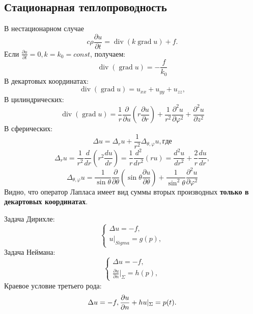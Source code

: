 \documentclass[11pt]{article}
\newcounter{th}\setcounter{th}{0}
\begin{document}
\subsection{Стационарная теплопроводность}
\label{sec:org97c7822}
В нестационарном случае
\begin{equation}
c\rho\frac{\partial u}{\partial t} = \operatorname{div}(k\operatorname{grad} u) + f.
\end{equation}
Если $\frac{\partial u}{\partial t} = 0, k = k_0 = const$, получаем:
\begin{equation}
\operatorname{div}(\operatorname{grad} u) = -\frac{f}{k_0}
\end{equation}
В декартовых координатах:
\begin{equation}
\operatorname{div}(\operatorname{grad} u) = u_{xx} + u_{yy} + u_{zz},
\end{equation}
В цилиндрических:
\begin{equation}
\operatorname{div}(\operatorname{grad} u) = \frac1r\frac{\partial}{\partial u}(r\frac{\partial u}{\partial r}) +
\frac1{r^2}\frac{\partial^2 u}{\partial \varphi^2} + \frac{\partial^2u}{\partial z^2}
\end{equation}
В сферических:
\begin{equation}
\Delta u = \Delta_ru + \frac1{r^2}\Delta_{\theta, \varphi}u, { где}
\end{equation}
\begin{equation}
\Delta_ru = \frac1{r^2}\frac{d}{dr}\left(r^2\frac{du}{dr}\right) = \frac1r\frac{d^2}{dr^2}(ru) =
\frac{d^2u}{dr^2} + \frac2r\frac{du}{dr},
\end{equation}
\begin{equation}
\Delta_{\theta, \varphi}u = \frac1{\sin\theta}\frac{\partial}{\partial\theta}\left(\sin\theta\frac{\partial u}{\partial\theta}\right) +
\frac1{\sin^2\theta}\frac{\partial^2u}{\partial\varphi^2}
\end{equation}
Видно, что оператор Лапласа имеет вид суммы вторых производных \textbf{только в декартовых
координатах}.

Задача Дирихле:
\begin{equation}
\begin{cases}
\Delta u = -f, \\
u|_{Sigma} = g(p),
\end{cases}
\end{equation}
Задача Неймана:
\begin{equation}
\begin{cases}
\Delta u = -f, \\
\frac{\partial u}{\partial n}|_{\Sigma} = h(p),
\end{cases}
\end{equation}
Краевое условие третьего рода:
\begin{equation}
\Delta u = -f, \\
\frac{\partial u}{\partial n} + hu|_{\Sigma} = p(t).
\end{equation}
\end{document}
